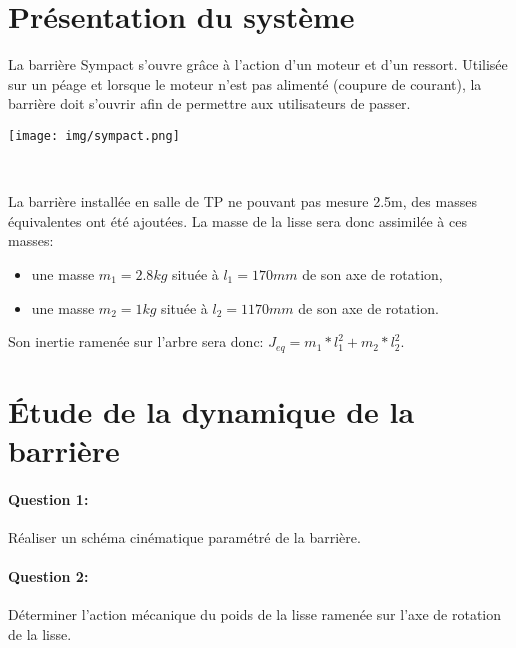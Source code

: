 





\section{Présentation du système}

\begin{minipage}{0.45\linewidth}
La barrière Sympact s'ouvre grâce à l'action d'un moteur et d'un ressort. Utilisée sur un péage et lorsque le moteur n'est pas alimenté (coupure de courant), la barrière doit s'ouvrir afin de permettre aux utilisateurs de passer.
\end{minipage}\hfill
\begin{minipage}{0.45\linewidth}
\begin{center}
 \texttt{[image: img/sympact.png]}
\end{center}
\end{minipage}

~\

La barrière installée en salle de TP ne pouvant pas mesure 2.5m, des masses équivalentes ont été ajoutées. La masse de la lisse sera donc assimilée à ces masses:
\begin{itemize}
 \item une masse $m_1=2.8kg$ située à $l_1=170mm$ de son axe de rotation,
 \item une masse $m_2=1kg$ située à $l_2=1170mm$ de son axe de rotation.
\end{itemize}

Son inertie ramenée sur l'arbre sera donc: $J_{eq}=m_1*l_1^2+m_2*l_2^2$.

\section{Étude de la dynamique de la barrière}

\paragraph{Question 1:} Réaliser un schéma cinématique paramétré de la barrière.

\paragraph{Question 2:} Déterminer l'action mécanique du poids de la lisse ramenée sur l'axe de rotation de la lisse.

